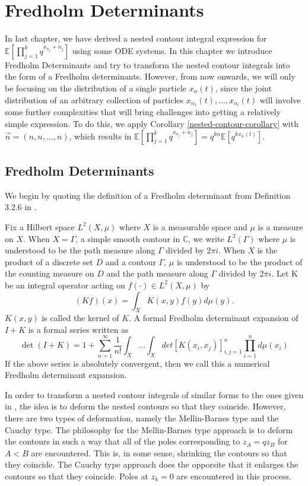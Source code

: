 \chapter{Fredholm Determinants}
In last chapter, we have derived a nested contour integral expression for $\mathbb{E}[\prod_{j=1}^k q^{x_{n_j}+n_j}]$ using some ODE systems. In this chapter we introduce Fredholm Determinants and try to transform the nested contour integrals into the form of a Fredholm determinants. However, from now onwards, we will only be focusing on the distribution of a single particle $x_n(t)$, since the joint distribution of an arbitrary collection of particles $x_{n_1}(t), \dots, x_{n_l}(t)$ will involve some further complexities that will bring challenges into getting a relatively simple expression. To do this, we apply Corollary \ref{nested-contour-corollary} with $\vec{n} = (n,n,\dots, n)$, which results in $\mathbb{E}[\prod_{j=1}^k q^{x_{n_j}+n_j}] = q^{kn} \mathbb{E} [q^{kx_n(t)}]$. 

\section{Fredholm Determinants}
We begin by quoting the definition of a Fredholm determinant from Definition 3.2.6 in \cite{macdonald2014}.

\begin{definition}
Fix a Hilbert space $L^2(X,\mu)$ where $X$ is a measurable space and $\mu$ is a measure on $X$. When $X = \Gamma$, a simple smooth contour in $\mathbb{C}$, we write $L^2(\Gamma)$ where $\mu$ is understood to be the path measure along $\Gamma$ divided by $2 \pi i$. When $X$ is the product of a discrete set $D$ and a contour $\Gamma$, $\mu$ is understood to be the product of the counting measure on $D$ and the path measure along $\Gamma$ divided by $2 \pi i$.
Let K be an integral operator acting on $f(\cdot) \in L^2(X,\mu)$ by $$(Kf)(x) = \int_X K(x,y) f(y) d\mu(y).$$ $K(x,y)$ is called the kernel of $K$. A formal Fredholm determinant expansion of $I+K$ is a formal series written as $$\det(I+K) = 1 + \sum_{n=1}^{\infty} \frac{1}{n!} \int_X \dots \int_X det[K(x_i,x_j)]_{i,j=1}^{n} \prod_{i=1}^{n} d\mu(x_i)$$
If the above series is absolutely convergent, then we call this a numerical Fredholm determinant expansion.
\end{definition}

In order to transform a nested contour integrals of similar forms to the ones given in , the idea is to deform the nested contours so that they coincide. However, there are two types of deformation, namely the Mellin-Barnes type and the Cauchy type. The philosophy for the Mellin-Barnes type approach is to deform the contours in such a way that all of the poles corresponding to $z_A = qz_B$ for $A < B$ are encountered. This is, in some sense, shrinking the contours so that they coincide. The Cauchy type approach does the opporsite that it enlarges the contours so that they coincide. Poles at $z_k = 0$ are encountered in this process.

